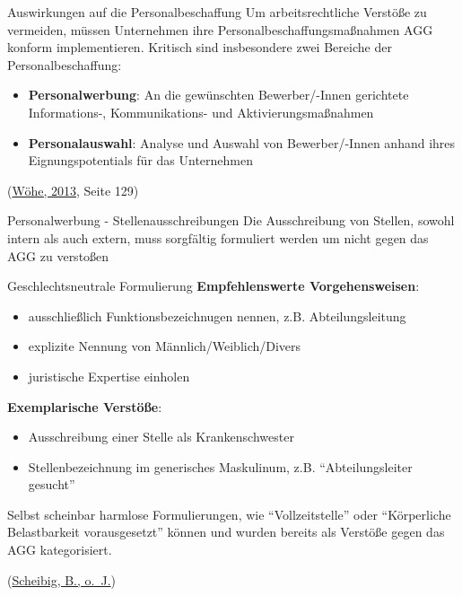 \documentclass[
  10pt,
  ignorenonframetext,
]{beamer}
\providecommand{\tightlist}{%
  \setlength{\itemsep}{0pt}\setlength{\parskip}{0pt}}
\begin{document}
\begin{frame}{Auswirkungen auf die Personalbeschaffung}
\protect\hypertarget{auswirkungen-auf-die-personalbeschaffung}{}
Um arbeitsrechtliche Verstöße zu vermeiden, müssen Unternehmen ihre
Personalbeschaffungsmaßnahmen AGG konform implementieren. Kritisch sind
insbesondere zwei Bereiche der Personalbeschaffung:

\begin{itemize}
\tightlist
\item
  \textbf{Personalwerbung}: An die gewünschten Bewerber/-Innen
  gerichtete Informations-, Kommunikations- und Aktivierungsmaßnahmen
\item
  \textbf{Personalauswahl}: Analyse und Auswahl von Bewerber/-Innen
  anhand ihres Eignungspotentials für das Unternehmen
\end{itemize}

(\protect\hyperlink{ref-woehe}{Wöhe, 2013}, Seite 129)
\end{frame}

\begin{frame}{Personalwerbung - Stellenausschreibungen}
\protect\hypertarget{personalwerbung---stellenausschreibungen}{}
Die Ausschreibung von Stellen, sowohl intern als auch extern, muss
sorgfältig formuliert werden um nicht gegen das AGG zu verstoßen
\end{frame}

\begin{frame}{Geschlechtsneutrale Formulierung}
\protect\hypertarget{geschlechtsneutrale-formulierung}{}
\textbf{Empfehlenswerte Vorgehensweisen}:

\begin{itemize}
\tightlist
\item
  ausschließlich Funktionsbezeichnugen nennen, z.B. Abteilungsleitung
\item
  explizite Nennung von Männlich/Weiblich/Divers
\item
  juristische Expertise einholen
\end{itemize}

\textbf{Exemplarische Verstöße}:

\begin{itemize}
\tightlist
\item
  Ausschreibung einer Stelle als Krankenschwester
\item
  Stellenbezeichnung im generisches Maskulinum, z.B. ``Abteilungsleiter
  gesucht''
\end{itemize}

Selbst scheinbar harmlose Formulierungen, wie ``Vollzeitstelle'' oder
``Körperliche Belastbarkeit vorausgesetzt'' können und wurden bereits
als Verstöße gegen das AGG kategorisiert.

(\protect\hyperlink{ref-ihk_wsb}{Scheibig, B., o.~J.})
\end{frame}
\end{document}
